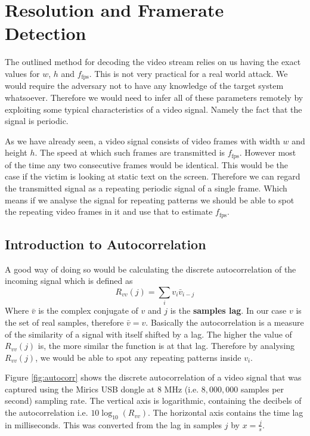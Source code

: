 \documentclass[a4paper,12pt,twoside,openright]{report}
\begin{document}
\section{Resolution and Framerate Detection}

The outlined method for decoding the video stream relies on us having the exact values for $w$, $h$ and $f_\text{fps}$. This is not very practical for a real world attack. We would require the adversary not to have any knowledge of the target system whatsoever. Therefore we would need to infer all of these parameters remotely by exploiting some typical characteristics of a video signal. Namely the fact that the signal is periodic.

As we have already seen, a video signal consists of video frames with width $w$ and height $h$. The speed at which such frames are transmitted is $f_\text{fps}$. However most of the time any two consecutive frames would be identical. This would be the case if the victim is looking at static text on the screen. Therefore we can regard the transmitted signal as a repeating periodic signal of a single frame. Which means if we analyse the signal for repeating patterns we should be able to spot the repeating video frames in it and use that to estimate $f_\text{fps}$.

\subsection{Introduction to Autocorrelation}
A good way of doing so would be calculating the discrete autocorrelation\cite{bracewell1965autocorrelation} of the incoming signal which is defined as 
$$ R_{vv}(j)=\sum\limits_{i} v_{i} \bar{v}_{i-j} $$
Where $\bar{v}$ is the complex conjugate of $v$ and $j$ is the \textbf{samples lag}. In our case $v$ is the set of real samples, therefore $\bar{v} = v$. Basically the autocorrelation is a measure of the similarity of a signal with itself shifted by a lag. The higher the value of $R_{vv}(j)$ is, the more similar the function is at that lag. Therefore by analysing $R_{vv}(j)$, we would be able to spot any repeating patterns inside $v_{i}$.

Figure \ref{fig:autocorr} shows the discrete autocorrelation of a video signal that was captured using the Mirics USB dongle at 8 MHz (i.e. $8,000,000$ samples per second) sampling rate. The vertical axis is logarithmic, containing the decibels of the autocorrelation i.e. $10 \log_{10}( R_{vv} )$. The horizontal axis contains the time lag in milliseconds. This was converted from the lag in samples $j$ by $x = \frac{j}{s}$.
\end{document}
